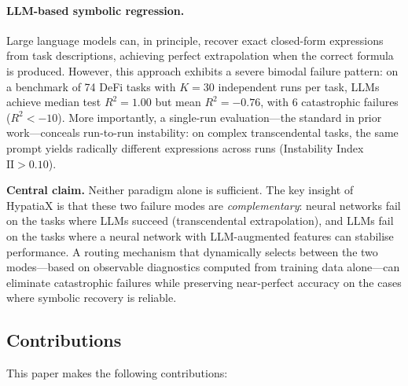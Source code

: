 \documentclass[twoside,11pt]{article}
\newcommand{\Rsq}{R^{2}}
\newcommand{\II}{\mathrm{II}}
\begin{document}
\paragraph{LLM-based symbolic regression.}
Large language models can, in principle, recover exact closed-form expressions from
task descriptions, achieving perfect extrapolation when the correct formula is
produced.  However, this approach exhibits a severe bimodal failure pattern: on
a benchmark of 74 DeFi tasks with $K=30$ independent runs per task, LLMs achieve
median test $\Rsq=1.00$ but mean $\Rsq=-0.76$, with 6 catastrophic failures
($\Rsq < -10$).  More importantly, a single-run evaluation---the standard in prior
work---conceals run-to-run instability: on complex transcendental tasks, the same
prompt yields radically different expressions across runs (Instability Index
$\II > 0.10$).

\medskip\noindent
\textbf{Central claim.}
Neither paradigm alone is sufficient.  The key insight of HypatiaX is that
these two failure modes are \emph{complementary}: neural networks fail on
the tasks where LLMs succeed (transcendental extrapolation), and LLMs fail
on the tasks where a neural network with LLM-augmented features can stabilise
performance.  A routing mechanism that dynamically selects between the two
modes---based on observable diagnostics computed from training data alone---can
eliminate catastrophic failures while preserving near-perfect accuracy on
the cases where symbolic recovery is reliable.

\subsection{Contributions}
\label{sec:contributions}

This paper makes the following contributions:
\end{document}
